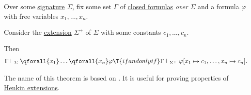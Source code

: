 \begin{theorem}\label{thm:theorem_on_constants}
  Over some \hyperref[def:fol_signature]{signature} \( \Sigma \), fix some set \( \Gamma \) of \hyperref[def:fol_closed_formula]{closed formulas} \emph{over} \( \Sigma \) and a formula \( \varphi \) with free variables \( x_1, \ldots, x_n \).

  Consider the \hyperref[def:fol_signature_extension]{extension} \( \Sigma^+ \) of \( \Sigma \) with some constants \( c_1, \ldots, c_n \).

  Then
  \begin{equation*}
    \Gamma \vdash_\Sigma \qforall {x_1} \ldots \qforall {x_n} \varphi \T{if and only if} \Gamma \vdash_{\Sigma^+} \varphi[x_1 \mapsto c_1, \ldots, x_n \mapsto c_n].
  \end{equation*}
\end{theorem}
\begin{comments}
  \item The name of this theorem is based on \cite{Shoenfield1967MathematicalLogic}. It is useful for proving properties of \hyperref[def:fol_henkin_extension]{Henkin extensions}.
\end{comments}
